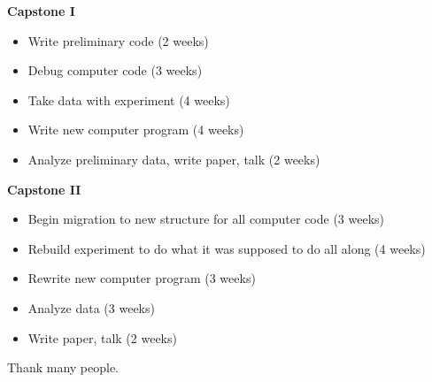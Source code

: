 \documentclass[aps,prb,twocolumn,groupedaddress,nofootinbib,floatfix]{revtex4}
\begin{document}
\vspace{0.2in}
{\bf Capstone I}
\begin{itemize}\itemsep1pt \parskip0pt 
\item Write preliminary code (2 weeks)
\item Debug computer code (3 weeks)
\item Take data with experiment (4 weeks)
\item Write new computer program (4 weeks)
\item Analyze preliminary data, write paper, talk (2 weeks)
\end{itemize}
{\bf Capstone II} 
\begin{itemize}\itemsep1pt \parskip0pt
\item Begin migration to new structure for all computer code (3 weeks)
\item Rebuild experiment to do what it was supposed to do all along (4 weeks)
\item Rewrite new computer program (3 weeks)
\item Analyze data (3 weeks)
\item Write paper, talk (2 weeks)
\end{itemize}

\begin{acknowledgments}
Thank many people.
\end{acknowledgments}
%
%



\end{document}
